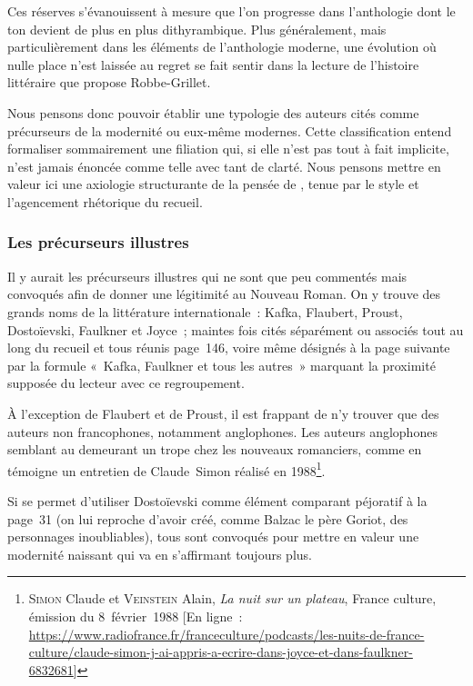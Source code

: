 Ces réserves s'évanouissent à mesure que l'on progresse dans l'anthologie dont le ton devient de plus en plus dithyrambique. Plus généralement, mais particulièrement dans les éléments de l'anthologie moderne, une évolution où nulle place n'est laissée au regret se fait sentir dans la lecture de l'histoire littéraire que propose Robbe-Grillet.

Nous pensons donc pouvoir établir une typologie des auteurs cités comme précurseurs de la modernité ou eux-même modernes. Cette classification entend formaliser sommairement une filiation qui, si elle n'est pas tout à fait implicite, n'est jamais énoncée comme telle avec tant de clarté. Nous pensons mettre en valeur ici une axiologie structurante de la pensée de \punr, tenue par le style et l'agencement rhétorique du recueil.

\subsubsection{Les précurseurs illustres}
Il y aurait les précurseurs illustres qui ne sont que peu commentés mais convoqués afin de donner une légitimité au Nouveau Roman. On y trouve des grands noms de la littérature internationale~: Kafka, Flaubert, Proust, Dostoïevski, Faulkner et Joyce~; maintes fois cités séparément ou associés tout au long du recueil et tous réunis page~146, voire même désignés à la page suivante par la formule «~Kafka, Faulkner et tous les autres~» marquant la proximité supposée du lecteur avec ce regroupement.

À l'exception de Flaubert et de Proust, il est frappant de n'y trouver que des auteurs non francophones, notamment anglophones. Les auteurs anglophones semblant au demeurant un trope chez les nouveaux romanciers, comme en témoigne un entretien de Claude~Simon réalisé en 1988\footnote{\textsc{Simon} Claude et \textsc{Veinstein} Alain, \textit{La nuit sur un plateau}, France culture, émission du 8~février~1988 [En ligne~: \href{https://www.radiofrance.fr/franceculture/podcasts/les-nuits-de-france-culture/claude-simon-j-ai-appris-a-ecrire-dans-joyce-et-dans-faulkner-6832681}{https://www.radiofrance.fr/franceculture/podcasts/les-nuits-de-france-culture/claude-simon-j-ai-appris-a-ecrire-dans-joyce-et-dans-faulkner-6832681}]}.

Si \robbe{} se permet d'utiliser Dostoïevski comme élément comparant péjoratif à la page~31 (on lui reproche d'avoir créé, comme Balzac le père Goriot, des personnages inoubliables), tous sont convoqués pour mettre en valeur une modernité naissant qui va en s'affirmant toujours plus.

